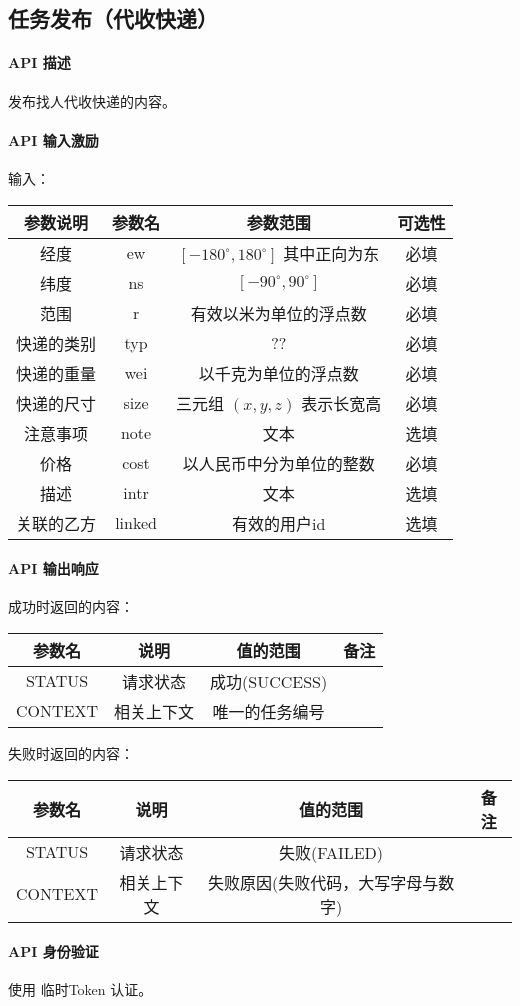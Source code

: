 \documentclass[UTF8]{article}
\def\apiintr{\paragraph{\colorbox[rgb]{0.78,0.7,0.65}{API 描述}}} %
\def\apiexc{\paragraph{\colorbox[rgb]{0.78,0.7,0.65}{API 输入激励}}} %
\def\apiresp{\paragraph{\colorbox[rgb]{0.78,0.7,0.65}{API 输出响应}}} %
\def\apiauth{\paragraph{\colorbox[rgb]{0.78,0.7,0.65}{API 身份验证}}} %
\def\失败{\colorbox[rgb]{1,0.5,0.5}{失败}}
\def\成功{\colorbox[rgb]{0.4,1,0.5}{成功}}
\def\成功V{成功(SUCCESS)}
\def\失败V{失败(FAILED)}
\def\失败原因{失败原因(失败代码，大写字母与数字)}
\begin{document}
    \subsection{任务发布（代收快递）}
    \apiintr
    发布找人代收快递的内容。
    \apiexc
    输入：\\
    \begin{tabular}{|c|c|c|c|}
        \hline \rule[-2ex]{0pt}{5.5ex} 参数说明 & 参数名 & 参数范围 & 可选性 \\
        \hline \rule[-2ex]{0pt}{5.5ex} 经度 & ew & $[-180^\circ,180^\circ]$ 其中正向为东 & 必填 \\
        \hline \rule[-2ex]{0pt}{5.5ex} 纬度 & ns & $[-90^\circ,90^\circ]$ & 必填 \\
        \hline \rule[-2ex]{0pt}{5.5ex} 范围 & r & 有效以米为单位的浮点数 & 必填 \\
        \hline \rule[-2ex]{0pt}{5.5ex} 快递的类别 & typ & ?? & 必填 \\
        \hline \rule[-2ex]{0pt}{5.5ex} 快递的重量 & wei & 以千克为单位的浮点数 & 必填 \\
        \hline \rule[-2ex]{0pt}{5.5ex} 快递的尺寸 & size & 三元组 $(x,y,z)$ 表示长宽高 & 必填 \\
        \hline \rule[-2ex]{0pt}{5.5ex} 注意事项 & note & 文本 & 选填 \\
        \hline \rule[-2ex]{0pt}{5.5ex} 价格 & cost & 以人民币中分为单位的整数 & 必填 \\
        \hline \rule[-2ex]{0pt}{5.5ex} 描述 & intr & 文本 & 选填 \\
        \hline \rule[-2ex]{0pt}{5.5ex} 关联的乙方 & linked & 有效的用户id & 选填 \\
        \hline 
    \end{tabular}
    \apiresp
    \成功 时返回的内容：\\
    \begin{tabular}{|c|c|c|c|}
        \hline \rule[-2ex]{0pt}{5.5ex} 参数名 & 说明 & 值的范围 & 备注 \\
        \hline \rule[-2ex]{0pt}{5.5ex} STATUS & 请求状态 & \成功V &  \\ 
        \hline \rule[-2ex]{0pt}{5.5ex} CONTEXT & 相关上下文 & 唯一的任务编号 &  \\
        \hline 
    \end{tabular} 
    \par \失败 时返回的内容：\\
    \begin{tabular}{|c|c|c|c|}
        \hline \rule[-2ex]{0pt}{5.5ex} 参数名 & 说明 & 值的范围 & 备注 \\
        \hline \rule[-2ex]{0pt}{5.5ex} STATUS & 请求状态 & \失败V &  \\ 
        \hline \rule[-2ex]{0pt}{5.5ex} CONTEXT & 相关上下文 & \失败原因 &  \\
        \hline 
    \end{tabular}
    \apiauth
    使用 临时Token 认证。
\end{document}
